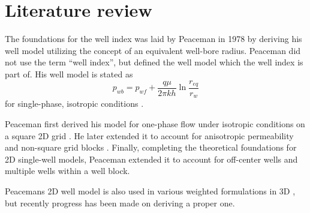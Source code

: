 
\section{Literature review} %
\label{sec:literature_review}
The foundations for the well index was laid by Peaceman in 1978 \cite{Aavatsmark2003Well} by deriving his well model utilizing the concept of an equivalent well-bore radius. Peaceman did not use the term ``well index'', but defined the well model which the well index is part of. His well model is stated as
\begin{equation}
    \label{eq:review-model}
    p_{wb} = p_{wf} + \frac{q\mu}{2\pi kh} \ln \frac{r_{eq}}{r_w}
\end{equation}
for single-phase, isotropic conditions \cite{Peaceman1990Interpretation}.

Peaceman first derived his model for one-phase flow under isotropic conditions on a square 2D grid \cite{Peaceman1978Interpretation}. He later extended it to account for anisotropic permeability and non-square grid blocks \cite{Peaceman1983Interpretation}. Finally, completing the theoretical foundations for 2D single-well models, Peaceman extended it to account for off-center wells and multiple wells within a well block.

Peacemans 2D well model is also used in various weighted formulations in 3D \cite{Aavatsmark2003Well}, but recently progress has been made on deriving a proper one.


